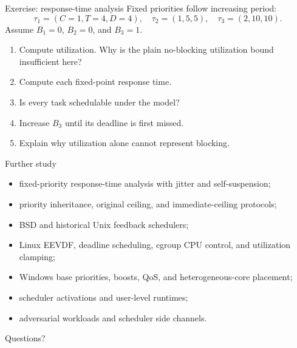 \documentclass[aspectratio=169,11pt]{beamer}
\begin{document}
\begin{frame}{Exercise: response-time analysis}
  Fixed priorities follow increasing period:
  \[
    \tau_1=(C=1,T=4,D=4),\quad
    \tau_2=(1,5,5),\quad
    \tau_3=(2,10,10).
  \]
  Assume $B_1=0$, $B_2=0$, and $B_3=1$.
  \begin{enumerate}
    \item Compute utilization. Why is the plain no-blocking utilization bound insufficient here?
    \item Compute each fixed-point response time.
    \item Is every task schedulable under the model?
    \item Increase $B_3$ until its deadline is first missed.
    \item Explain why utilization alone cannot represent blocking.
  \end{enumerate}
\end{frame}

\begin{frame}{Further study}
  \begin{itemize}
    \item fixed-priority response-time analysis with jitter and self-suspension;
    \item priority inheritance, original ceiling, and immediate-ceiling protocols;
    \item BSD and historical Unix feedback schedulers;
    \item Linux EEVDF, deadline scheduling, cgroup CPU control, and utilization clamping;
    \item Windows base priorities, boosts, QoS, and heterogeneous-core placement;
    \item scheduler activations and user-level runtimes;
    \item adversarial workloads and scheduler side channels.
  \end{itemize}
  \vfill
  \begin{center}\Large Questions?\end{center}
\end{frame}
\end{document}
